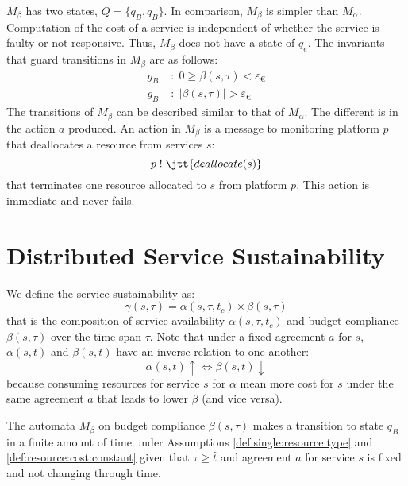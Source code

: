 $M_\beta$ has two states, $Q = \{q_B, q_{\overline{B}} \}$.
In comparison, $M_\beta$ is simpler than $M_\alpha$.
Computation of the cost of a service is independent of whether the service is faulty or not responsive.
Thus, $M_\beta$ does not have a state of $q_e$.
The invariants that guard transitions in $M_\beta$ are as follows:
\begin{align}
g_B \; &: \; 0 \geq \beta(s,\tau) < \varepsilon_{\euro} \\
g_{\overline{B}} \; &: \; |\beta(s,\tau)| > \varepsilon_{\euro}
\end{align}
The transitions of $M_\beta$ can be described similar to that of $M_\alpha$.
The different is in the action $\dot{a}$ produced.
An action in $M_\beta$ is a message to monitoring platform $p$ that deallocates a resource from services $s$:
\[
p \; ! \; \jtt{deallocate(s)}
\]
that terminates one resource allocated to $s$ from platform $p$.
This action is immediate and never fails.

\section{Distributed Service Sustainability} %
\label{sec:distributed_service_sustainability}
\begin{defn}
\label{def:service:sustain}
We define the service sustainability as:
\[
\gamma(s,\tau) = \alpha(s,\tau,t_c) \times \beta(s,\tau)
\]
that is the composition of service availability $\alpha(s,\tau,t_c)$ and budget compliance $\beta(s,\tau)$ over the time span $\tau$.
Note that under a fixed agreement $a$ for $s$, $\alpha(s,t)$ and $\beta(s,t)$ have an inverse relation to one another:
\[
\alpha(s,t) \uparrow \iff \beta(s,t) \downarrow
\]
because consuming resources for service $s$ for $\alpha$ mean more cost for $s$ under the same agreement $a$ that leads to lower $\beta$ (and vice versa).
\end{defn}


\begin{theorem}
\label{thm:budget:comp:conv}
The automata $M_\beta$ on budget compliance $\beta(s,\tau)$ makes a transition to state $q_B$ in a finite amount of time under Assumptions \ref{def:single:resource:type} and \ref{def:resource:cost:constant} given that $\tau \geq \hat{t}$ and agreement $a$ for service $s$ is fixed and not changing through time.
\end{theorem}

